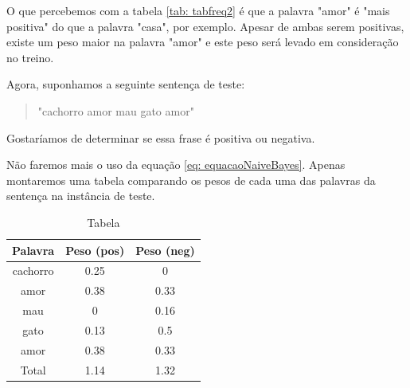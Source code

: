 \documentclass[
article,			%
12pt,				%
a4paper,			%
english,			%
brazil,				%
sumario=tradicional,
twoside
]{abntex2}
\begin{document}
	O que percebemos com a tabela \ref{tab: tabfreq2} é que a palavra "amor" é "mais positiva" do que a palavra "casa", por exemplo. Apesar de ambas serem positivas, existe um peso maior na palavra "amor" e este peso será levado em consideração no treino.

	Agora, suponhamos a seguinte sentença de teste:
	\begin{quote}
		"cachorro amor mau gato amor"
	\end{quote}
    
    Gostaríamos de determinar se essa frase é positiva ou negativa.
    
    Não faremos mais o uso da equação \ref{eq: equacaoNaiveBayes}. Apenas montaremos uma tabela comparando os pesos de cada uma das palavras da sentença na instância de teste.
    
    
		\begin{table}[h]
		\caption{Tabela}
		\label{tab: tabfreq3}
		\centering
		
		\begin{tabular}{|c|c|c|} \hline
			\textbf{Palavra} & \textbf{Peso (pos)} & \textbf{Peso (neg)}\\
			\hline
			cachorro & 0.25 & 0\\
			amor & 0.38 & 0.33\\
			mau & 0 & 0.16\\
			gato & 0.13 & 0.5\\
			amor & 0.38 & 0.33\\
			\hline
			Total & 1.14 & 1.32 \\
			\hline
			
		\end{tabular}
		
	\end{table}	
	
	
	\newpage
	\nocite{sitenaive}
	
	
	
\end{document}
